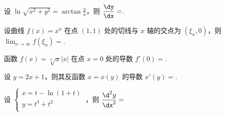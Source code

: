 \begin{problem}设 $\displaystyle \ln\sqrt{x^{2} + y^{2}} = \arctan\frac{y}{x}$，则
$\displaystyle \frac{\dy}{\dx} =$.

\end{problem}

\begin{problem}
	设曲线 $f\left( x \right) = x^{n}$ 在点 $(1,1)$ 处的切线与 $x$
	轴的交点为
	$(\xi_{n},0)$，则$\displaystyle \lim_{n \rightarrow \infty}{f(\xi_{n})} =$.



\end{problem}           \begin{problem} 函数 $f\left( x \right) = \sqrt[3]{x}|x|$ 在点 $x = 0$ 处的导数
$f'\left( 0 \right) =$.


\end{problem}           \begin{problem}设 $y = 2x + 1$，则其反函数 $x = x(y)$ 的导数
$x'\left( y \right) =$.


%

\end{problem}           

\begin{problem}
设 $ 
\begin{cases}
x = t - \ln(1 + t) \\
y = t^{3} + t^{2} \\
\end{cases}\ $，则
$\displaystyle \frac{\d^{2}y}{\dx^{2}} =$



\end{problem}           


